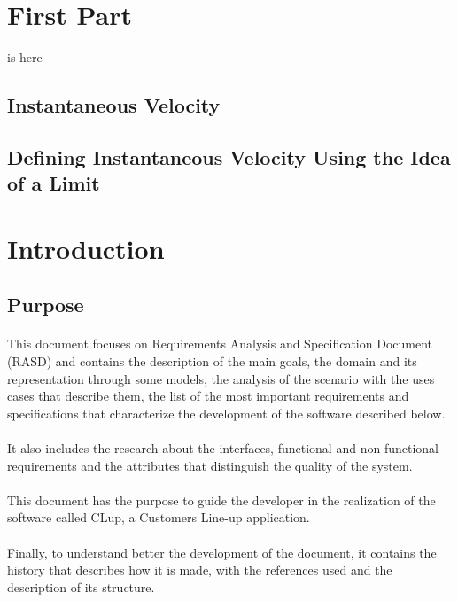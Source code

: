 \section{First Part}
is here
\subsection{Instantaneous Velocity}

\subsection{Defining Instantaneous Velocity Using the Idea of a Limit}
\vfill
\section{Introduction}
\subsection{Purpose}
\paragraph{}
This document focuses on Requirements Analysis and Specification Document (RASD) and contains the description of the main goals, the domain and its representation through some models, the analysis of the scenario with the uses cases that describe them, the list of the most important requirements and specifications that characterize the development of the software described below.

\paragraph{}
It also includes the research about the interfaces, functional and non-functional requirements and the attributes that distinguish the quality of the system.

\paragraph{}
This document has the purpose to guide the developer in the realization of the software called CLup, a Customers Line-up application.

\paragraph{}
Finally, to understand better the development of the document, it contains the history that describes how it is made, with the references used and the description of its structure.

